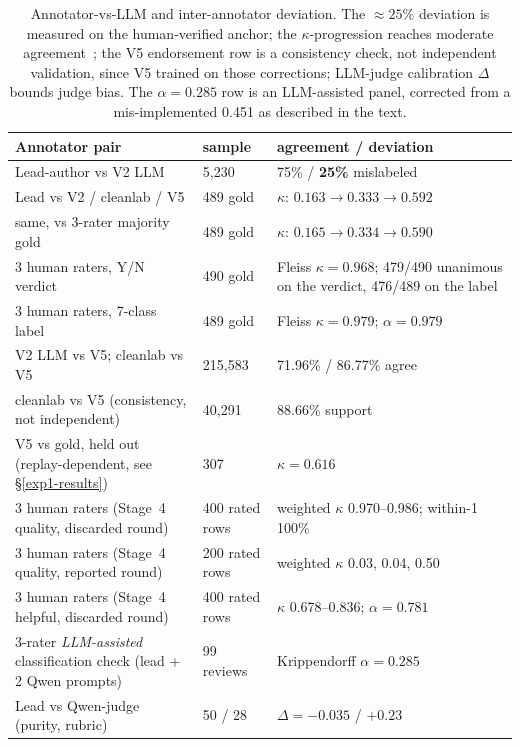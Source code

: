 \documentclass[11pt]{article}
\begin{document}
\begin{table}[t]\centering\footnotesize
  
  \begin{tabular}{@{}p{4.0cm}p{1.5cm}p{2.5cm}@{}}\toprule
  Annotator pair & sample & agreement / deviation \\\midrule
  Lead-author vs V2 LLM & 5{,}230 & 75\% / \textbf{25\%} mislabeled \\
  Lead vs V2 / cleanlab / V5 & 489 gold & $\kappa$: $0.163 \to 0.333 \to \mathbf{0.592}$ \\
  same, vs 3-rater majority gold & 489 gold & $\kappa$: $0.165 \to 0.334 \to \mathbf{0.590}$ \\
  3 human raters, Y/N verdict & 490 gold & Fleiss $\kappa = \mathbf{0.968}$; 479/490 unanimous on the verdict, 476/489 on the label \\
  3 human raters, 7-class label & 489 gold & Fleiss $\kappa = \mathbf{0.979}$; $\alpha = 0.979$ \\
  V2 LLM vs V5; cleanlab vs V5 & 215{,}583 & 71.96\% / 86.77\% agree \\
  cleanlab vs V5 (consistency, not independent) & 40{,}291 & 88.66\% support \\
  V5 vs gold, held out (replay-dependent, see \S\ref{exp1-results}) & 307 & $\kappa = \mathbf{0.616}$ \\
  3 human raters (Stage~4 quality, discarded round) & 400 rated rows & weighted $\kappa$ 0.970--0.986; within-1 100\% \\
  3 human raters (Stage~4 quality, reported round) & 200 rated rows & weighted $\kappa$ 0.03, 0.04, 0.50 \\
  3 human raters (Stage~4 helpful, discarded round) & 400 rated rows & $\kappa$ 0.678--0.836; $\alpha = 0.781$ \\
  3-rater \emph{LLM-assisted} classification check (lead + 2 Qwen prompts) & 99 reviews & Krippendorff $\alpha = 0.285$ \\
  Lead vs Qwen-judge (purity, rubric) & 50 / 28 & $\Delta = -0.035$ / $+0.23$ \\
  \bottomrule\end{tabular}
\caption{Annotator-vs-LLM and inter-annotator deviation. The $\approx 25\%$ deviation is
  measured on the human-verified anchor; the $\kappa$-progression reaches moderate
  agreement~\cite{landis1977measurement}; the V5 endorsement row is a consistency check, not independent validation, since V5 trained on those corrections;
  LLM-judge calibration $\Delta$ bounds judge bias. The $\alpha = 0.285$ row is an LLM-assisted
  panel, corrected from a mis-implemented 0.451 as described in the text.}\label{tab:annot-deviation}\end{table}
\end{document}
